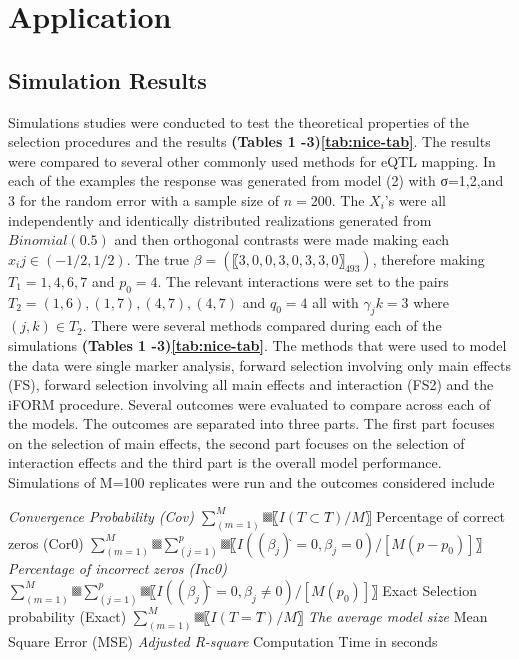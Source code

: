 \documentclass[11pt,]{book}
\theoremstyle{definition}
\theoremstyle{definition}
\theoremstyle{remark}
\begin{document}
\section{Application}\label{application}

\subsection{Simulation Results}\label{simulation-results}

Simulations studies were conducted to test the theoretical properties of
the selection procedures and the results \textbf{(Tables 1
-3)\ref{tab:nice-tab}}. The results were compared to several other
commonly used methods for eQTL mapping. In each of the examples the
response was generated from model (2) with σ=1,2,and 3 for the random
error with a sample size of \(n=200\). The \(X_i\)'s were all
independently and identically distributed realizations generated from
\(Binomial(0.5)\) and then orthogonal contrasts were made making each
\(x_ij∈(-1/2,1/2)\). The true \(β=(〖3,0,0,3,0,3,3,0〗_493)\), therefore
making \(T_1={1,4,6,7}\) and \(p_0=4\). The relevant interactions were
set to the pairs \(T_2={(1,6),(1,7),(4,7),(4,7)}\) and \(q_0=4\) all
with \(γ_jk=3\) where \((j,k)∈T_2\). There were several methods compared
during each of the simulations \textbf{(Tables 1 -3)\ref{tab:nice-tab}}.
The methods that were used to model the data were single marker
analysis, forward selection involving only main effects (FS), forward
selection involving all main effects and interaction (FS2) and the iFORM
procedure. Several outcomes were evaluated to compare across each of the
models. The outcomes are separated into three parts. The first part
focuses on the selection of main effects, the second part focuses on the
selection of interaction effects and the third part is the overall model
performance. Simulations of M=100 replicates were run and the outcomes
considered include

\emph{Convergence Probability (Cov) \(∑_(m=1)^M▒〖I(T⊂T ̂ )/M〗\)
}Percentage of correct zeros (Cor0)
\(∑_(m=1)^M▒∑_(j=1)^p▒〖I((β_j ) ̂=0,β_j=0)/[M(p-p_0)]〗\)
\emph{Percentage of incorrect zeros (Inc0)
\(∑_(m=1)^M▒∑_(j=1)^p▒〖I((β_j ) ̂=0,β_j≠0)/[M(p_0)]〗\) }Exact Selection
probability (Exact) \(∑_(m=1)^M▒〖I(T=T ̂ )/M 〗\) \emph{The average
model size }Mean Square Error (MSE) \emph{Adjusted R-square }Computation
Time in seconds
\end{document}
